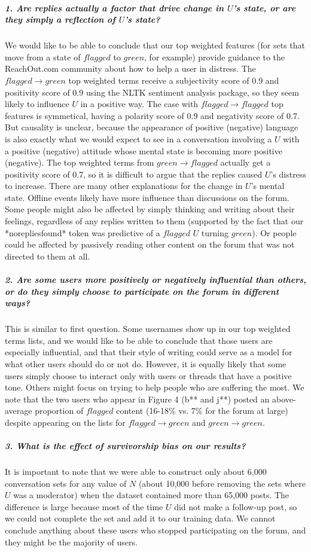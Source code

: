 \documentclass{article}
\begin{document}
\subparagraph{1. Are replies actually a factor that drive change in $U$'s state, or are they simply a reflection of $U$'s state?}We would like to be able to conclude that our top weighted features (for sets that move from a state of $flagged$ to $green$, for example) provide guidance to the ReachOut.com community about how to help a user in distress. The $flagged \rightarrow green$ top weighted terms receive a subjectivity score of 0.9 and positivity score of 0.9 using the NLTK sentiment analysis package, so they seem likely to influence $U$ in a positive way. The case with $flagged \rightarrow flagged$ top features is symmetical, having a polarity score of 0.9 and negativity score of 0.7. But causality is unclear, because the appearance of positive (negative) language is also exactly what we would expect to see in a conversation involving a $U$ with a positive (negative) attitude whose mental state is becoming more positive (negative). The top weighted terms from $green \rightarrow flagged$ actually get a positivity score of 0.7, so it is difficult to argue that the replies caused $U$'s distress to increase. There are many other explanations for the change in $U$'s mental state. Offline events likely have more influence than discussions on the forum. Some people might also be affected by simply thinking and writing about their feelings, regardless of any replies written to them (supported by the fact that our *norepliesfound* token was predictive of a $flagged$ $U$ turning $green$). Or people could be affected by passively reading other content on the forum that was not directed to them at all.

\subparagraph{2. Are some users more positively or negatively influential than others, or do they simply choose to participate on the forum in different ways?}This is similar to first question. Some usernames show up in our top weighted terms lists, and we would like to be able to conclude that those users are especially influential, and that their style of writing could serve as a model for what other users should do or not do. However, it is equally likely that some users simply choose to interact only with users or threads that have a positive tone. Others might focus on trying to help people who are suffering the most. We note that the two users who appear in Figure 4 (b** and j**) posted an above-average proportion of $flagged$ content (16-18\% vs. 7\% for the forum at large) despite appearing on the lists for $flagged \rightarrow green$ and $green \rightarrow green$.

\subparagraph{3. What is the effect of survivorship bias on our results?}It is important to note that we were able to construct only about 6,000 conversation sets for any value of $N$ (about 10,000 before removing the sets where $U$ was a moderator) when the dataset contained more than 65,000 posts. The difference is large because most of the time $U$ did not make a follow-up post, so we could not complete the set and add it to our training data. We cannot conclude anything about these users who stopped participating on the forum, and they might be the majority of users.
\end{document}

